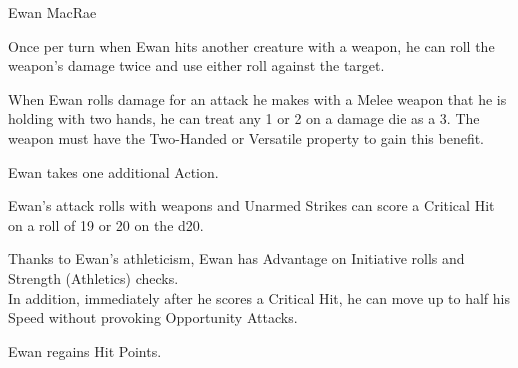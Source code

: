 \begin{DndMonster}[width=0.5\textwidth]{Ewan MacRae}
	
	\DndMonsterBasics[
		armor-class = {17 (Splint Mail)},
		hit-points  = {\DndDice{4d10 + 8}},
		speed       = {30 ft.},
	]
	
	\renewcommand{\AbilityScoreSpacer}{~}
	\DndMonsterAbilityScores[
		str = 18,
		dex = 18,
		con = 15,
		int = 8,
		wis = 13,
		cha = 14,
	]
	
	\DndMonsterDetails[
		saving-throws = {STR +6, CON +4},
		skills = {Athletics +6, Animal Handling +3, Perception +3},
		senses = {Passive Perception 13},
		languages = {Common},
		challenge = 1,
	]
	
    Once per turn when Ewan hits another creature with a weapon, he can roll the weapon's damage twice and use either roll against the target.
    
	When Ewan rolls damage for an attack he makes with a Melee weapon that he is holding with two hands, he can treat any 1 or 2 on a damage die as a 3. The weapon must have the Two-Handed or Versatile property to gain this benefit.
	
    Ewan takes one additional Action.
	
	Ewan's attack rolls with weapons and Unarmed Strikes can score a Critical Hit on a roll of 19 or 20 on the d20.
	
	Thanks to Ewan's athleticism, Ewan has Advantage on Initiative rolls and Strength (Athletics) checks.\\
	In addition, immediately after he scores a Critical Hit, he can move up to half his Speed without provoking Opportunity Attacks.
	
	\DndMonsterAttack[
		name=Greatsword,
		distance=melee, %
		mod=+6,
		reach=5,
		targets=one target,
		dmg=\DndDice{2d6 + 4},
		dmg-type=slashing,
	]
	
	\DndMonsterAttack[
		name=Shortbow,
		distance=ranged, %
		mod=+7,
		range=80/320,
		targets=one target,
		dmg=\DndDice{1d6 + 3},
		dmg-type=piercing,
	]
	
	Ewan regains  Hit Points.
\end{DndMonster}